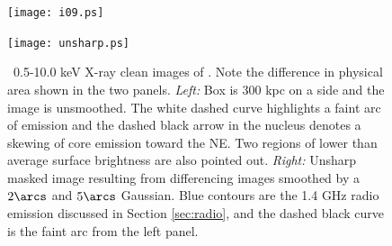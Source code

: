 \begin{figure}
  \begin{center}
    \begin{minipage}{0.495\linewidth}
      \texttt{[image: i09.ps]}
    \end{minipage}
    \begin{minipage}{0.495\linewidth}
      \texttt{[image: unsharp.ps]}
    \end{minipage}
    \caption{\cxo\ 0.5-10.0 keV X-ray clean images of \irs. Note the
      difference in physical area shown in the two
      panels. {\it{Left:}} Box is 300 kpc on a side and the image is
      unsmoothed. The white dashed curve highlights a faint arc of
      emission and the dashed black arrow in the nucleus denotes a
      skewing of core emission toward the NE. Two regions of lower
      than average surface brightness are also pointed
      out. {\it{Right:}} Unsharp masked image resulting from
      differencing images smoothed by a $2\arcs$ and $5\arcs$
      Gaussian. Blue contours are the 1.4 GHz radio emission discussed
      in Section \ref{sec:radio}, and the dashed black curve is the
      faint arc from the left panel.}
    \label{fig:imgs}
  \end{center}
\end{figure}

